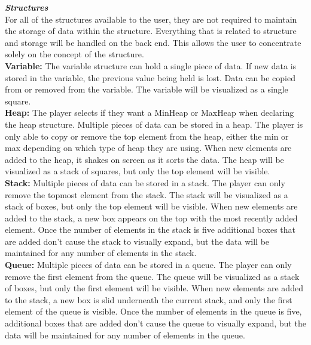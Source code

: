 \textbf{\textit{Structures}}\\
For all of the structures available to the user, they are not required to maintain the storage of data within the 
structure. Everything that is related to structure and storage will be handled on the back end. This allows the 
user to concentrate solely on the concept of the structure.\\

\textbf{Variable:}
The variable structure can hold a single piece of data. If new data is stored in the variable, the previous value 
being held is lost. Data can be copied from or removed from the variable. The variable will be visualized as a 
single square.\\

\textbf{Heap:}
The player selects if they want a MinHeap or MaxHeap when declaring the heap structure. Multiple pieces of 
data can be stored in a heap. The player is only able to copy or remove the top element from the heap, either 
the min or max depending on which type of heap they are using. When new elements are added to the heap, 
it shakes on screen as it sorts the data. The heap will be visualized as a stack of squares, but only the top 
element will be visible.\\

\textbf{Stack:}
Multiple pieces of data can be stored in a stack. The player can only remove the topmost element from the 
stack. The stack will be visualized as a stack of boxes, but only the top element will be visible. When new 
elements are added to the stack, a new box appears on the top with the most recently added element. Once 
the number of elements in the stack is five additional boxes that are added don’t cause the stack to visually 
expand, but the data will be maintained for any number of elements in the stack.\\

\textbf{Queue:}
Multiple pieces of data can be stored in a queue. The player can only remove the first element from the queue. 
The queue will be visualized as a stack of boxes, but only the first element will be visible. When new elements 
are added to the stack, a new box is slid underneath the current stack, and only the first element of the queue 
is visible. Once the number of elements in the queue is five, additional boxes that are added don’t cause the 
queue to visually expand, but the data will be maintained for any number of elements in the queue.\\

